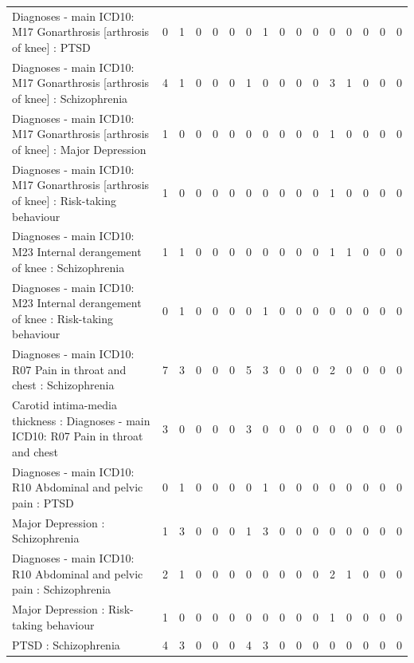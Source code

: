 \begin{table}[ht]
\begin{tabular}{lrrrrrrrrrrrrrrr}
  Diagnoses - main ICD10: M17 Gonarthrosis [arthrosis of knee] : PTSD &   0 &   1 &   0 &   0 &   0 &   0 &   1 &   0 &   0 &   0 &   0 &   0 &   0 &   0 &   0 \\ 
  Diagnoses - main ICD10: M17 Gonarthrosis [arthrosis of knee] : Schizophrenia &   4 &   1 &   0 &   0 &   0 &   1 &   0 &   0 &   0 &   0 &   3 &   1 &   0 &   0 &   0 \\ 
  Diagnoses - main ICD10: M17 Gonarthrosis [arthrosis of knee] : Major Depression &   1 &   0 &   0 &   0 &   0 &   0 &   0 &   0 &   0 &   0 &   1 &   0 &   0 &   0 &   0 \\ 
  Diagnoses - main ICD10: M17 Gonarthrosis [arthrosis of knee] : Risk-taking behaviour &   1 &   0 &   0 &   0 &   0 &   0 &   0 &   0 &   0 &   0 &   1 &   0 &   0 &   0 &   0 \\ 
  Diagnoses - main ICD10: M23 Internal derangement of knee : Schizophrenia &   1 &   1 &   0 &   0 &   0 &   0 &   0 &   0 &   0 &   0 &   1 &   1 &   0 &   0 &   0 \\ 
  Diagnoses - main ICD10: M23 Internal derangement of knee : Risk-taking behaviour &   0 &   1 &   0 &   0 &   0 &   0 &   1 &   0 &   0 &   0 &   0 &   0 &   0 &   0 &   0 \\ 
  Diagnoses - main ICD10: R07 Pain in throat and chest : Schizophrenia &   7 &   3 &   0 &   0 &   0 &   5 &   3 &   0 &   0 &   0 &   2 &   0 &   0 &   0 &   0 \\ 
  Carotid intima-media thickness : Diagnoses - main ICD10: R07 Pain in throat and chest &   3 &   0 &   0 &   0 &   0 &   3 &   0 &   0 &   0 &   0 &   0 &   0 &   0 &   0 &   0 \\ 
  Diagnoses - main ICD10: R10 Abdominal and pelvic pain : PTSD &   0 &   1 &   0 &   0 &   0 &   0 &   1 &   0 &   0 &   0 &   0 &   0 &   0 &   0 &   0 \\ 
  Major Depression : Schizophrenia &   1 &   3 &   0 &   0 &   0 &   1 &   3 &   0 &   0 &   0 &   0 &   0 &   0 &   0 &   0 \\ 
  Diagnoses - main ICD10: R10 Abdominal and pelvic pain : Schizophrenia &   2 &   1 &   0 &   0 &   0 &   0 &   0 &   0 &   0 &   0 &   2 &   1 &   0 &   0 &   0 \\ 
  Major Depression : Risk-taking behaviour &   1 &   0 &   0 &   0 &   0 &   0 &   0 &   0 &   0 &   0 &   1 &   0 &   0 &   0 &   0 \\ 
  PTSD : Schizophrenia &   4 &   3 &   0 &   0 &   0 &   4 &   3 &   0 &   0 &   0 &   0 &   0 &   0 &   0 &   0 \\ 

\end{tabular}
\end{table}

